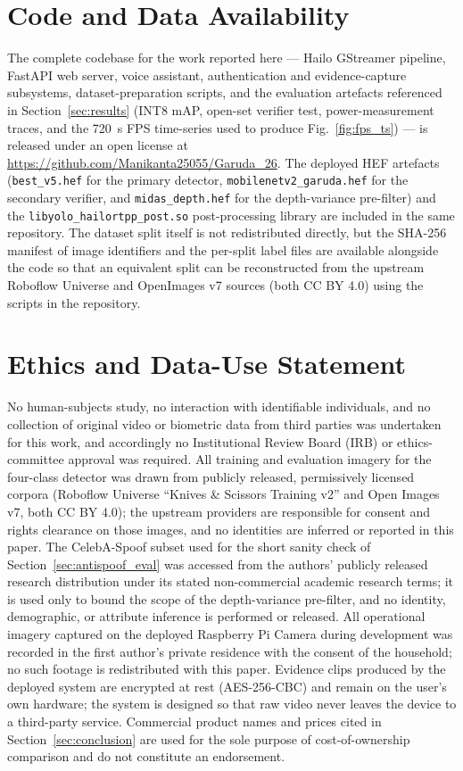 \documentclass{ieeeaccess}
\begin{document}
\section*{Code and Data Availability}
\label{sec:code_data}
The complete codebase for the work reported here --- Hailo GStreamer pipeline, FastAPI web server, voice assistant, authentication and evidence-capture subsystems, dataset-preparation scripts, and the evaluation artefacts referenced in Section~\ref{sec:results} (INT8 mAP, open-set verifier test, power-measurement traces, and the 720~s FPS time-series used to produce Fig.~\ref{fig:fps_ts}) --- is released under an open license at \url{https://github.com/Manikanta25055/Garuda_26}. The deployed HEF artefacts (\texttt{best\_v5.hef} for the primary detector, \texttt{mobilenetv2\_garuda.hef} for the secondary verifier, and \texttt{midas\_depth.hef} for the depth-variance pre-filter) and the \texttt{libyolo\_hailortpp\_post.so} post-processing library are included in the same repository. The dataset split itself is not redistributed directly, but the SHA-256 manifest of image identifiers and the per-split label files are available alongside the code so that an equivalent split can be reconstructed from the upstream Roboflow Universe and OpenImages v7 sources (both CC BY 4.0) using the scripts in the repository.

\section*{Ethics and Data-Use Statement}
\label{sec:ethics}
No human-subjects study, no interaction with identifiable individuals, and no collection of original video or biometric data from third parties was undertaken for this work, and accordingly no Institutional Review Board (IRB) or ethics-committee approval was required. All training and evaluation imagery for the four-class detector was drawn from publicly released, permissively licensed corpora (Roboflow Universe ``Knives \& Scissors Training v2'' and Open Images v7, both CC BY 4.0); the upstream providers are responsible for consent and rights clearance on those images, and no identities are inferred or reported in this paper. The CelebA-Spoof subset used for the short sanity check of Section~\ref{sec:antispoof_eval} was accessed from the authors' publicly released research distribution under its stated non-commercial academic research terms; it is used only to bound the scope of the depth-variance pre-filter, and no identity, demographic, or attribute inference is performed or released. All operational imagery captured on the deployed Raspberry Pi Camera during development was recorded in the first author's private residence with the consent of the household; no such footage is redistributed with this paper. Evidence clips produced by the deployed system are encrypted at rest (AES-256-CBC) and remain on the user's own hardware; the system is designed so that raw video never leaves the device to a third-party service. Commercial product names and prices cited in Section~\ref{sec:conclusion} are used for the sole purpose of cost-of-ownership comparison and do not constitute an endorsement.
\end{document}

